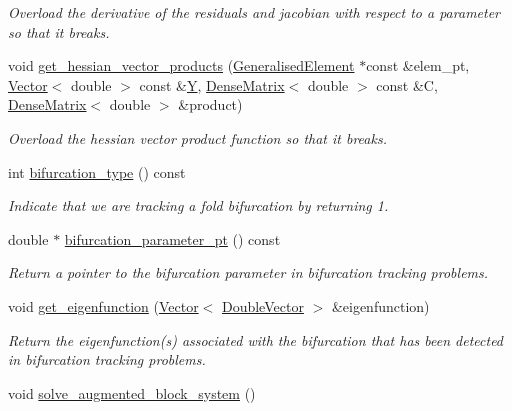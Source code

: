 \begin{DoxyCompactItemize}
\begin{DoxyCompactList}\small\item\em Overload the derivative of the residuals and jacobian with respect to a parameter so that it breaks. \end{DoxyCompactList}\item 
void \hyperlink{classoomph_1_1FoldHandler_aa633b80f1ebdb322350c6832fe6c2b6c}{get\+\_\+hessian\+\_\+vector\+\_\+products} (\hyperlink{classoomph_1_1GeneralisedElement}{Generalised\+Element} $\ast$const \&elem\+\_\+pt, \hyperlink{classoomph_1_1Vector}{Vector}$<$ double $>$ const \&\hyperlink{classoomph_1_1FoldHandler_ac8697e5d9484fc0488d4c16b822c792e}{Y}, \hyperlink{classoomph_1_1DenseMatrix}{Dense\+Matrix}$<$ double $>$ const \&C, \hyperlink{classoomph_1_1DenseMatrix}{Dense\+Matrix}$<$ double $>$ \&product)
\begin{DoxyCompactList}\small\item\em Overload the hessian vector product function so that it breaks. \end{DoxyCompactList}\item 
int \hyperlink{classoomph_1_1FoldHandler_adb2878f53be92ea2be6cc012cbfc27ba}{bifurcation\+\_\+type} () const
\begin{DoxyCompactList}\small\item\em Indicate that we are tracking a fold bifurcation by returning 1. \end{DoxyCompactList}\item 
double $\ast$ \hyperlink{classoomph_1_1FoldHandler_a0e35268f1b13aa94739aaaaa366f4586}{bifurcation\+\_\+parameter\+\_\+pt} () const
\begin{DoxyCompactList}\small\item\em Return a pointer to the bifurcation parameter in bifurcation tracking problems. \end{DoxyCompactList}\item 
void \hyperlink{classoomph_1_1FoldHandler_aca97058722ccc1482ae8180ea8dde74c}{get\+\_\+eigenfunction} (\hyperlink{classoomph_1_1Vector}{Vector}$<$ \hyperlink{classoomph_1_1DoubleVector}{Double\+Vector} $>$ \&eigenfunction)
\begin{DoxyCompactList}\small\item\em Return the eigenfunction(s) associated with the bifurcation that has been detected in bifurcation tracking problems. \end{DoxyCompactList}\item 
void \hyperlink{classoomph_1_1FoldHandler_a7718a18444f6e328953dd5d5e73802f8}{solve\+\_\+augmented\+\_\+block\+\_\+system} ()

\end{DoxyCompactItemize}
